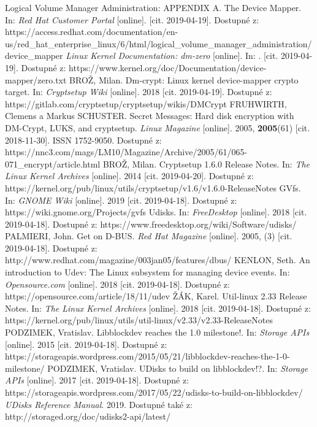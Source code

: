 \documentclass[a4paper,12pt]{article}
\begin{document}
{
Logical Volume Manager Administration: APPENDIX A. The Device Mapper. In: \textit{Red Hat Customer Portal} [online]. [cit. 2019-04-19]. Dostupné z: https://access.redhat.com/documentation/en-us/red\_hat\_enterprise\_linux/6/html/logical\_volume\_manager\_administration/\\device\_mapper
\textit{Linux Kernel Documentation: dm-zero} [online]. In: . [cit. 2019-04-19]. Dostupné z: https://www.kernel.org/doc/Documentation/device-mapper/zero.txt
BROŽ, Milan. Dm-crypt: Linux kernel device-mapper crypto target. In: \textit{Cryptsetup Wiki} [online]. 2018 [cit. 2019-04-19]. Dostupné z: https://gitlab.com/cryptsetup/cryptsetup/wikis/DMCrypt
FRUHWIRTH, Clemens a Markus SCHUSTER. Secret Messages: Hard disk encryption with DM-Crypt, LUKS, and cryptsetup. \textit{Linux Magazine} [online]. 2005, \textbf{2005}(61) [cit. 2018-11-30]. ISSN 1752-9050. Dostupné z: https://nnc3.com/mags/LM10/Magazine/Archive/2005/61/065-071\_encrypt/article.html
BROŽ, Milan. Cryptsetup 1.6.0 Release Notes. In: \textit{The Linux Kernel Archives} [online]. 2014 [cit. 2019-04-20]. Dostupné z: https://kernel.org/pub/linux/utils/cryptsetup/v1.6/v1.6.0-ReleaseNotes
GVfs. In: \textit{GNOME Wiki} [online]. 2019 [cit. 2019-04-18]. Dostupné z: https://wiki.gnome.org/Projects/gvfs
Udisks. In: \textit{FreeDesktop} [online]. 2018 [cit. 2019-04-18]. Dostupné z: https://www.freedesktop.org/wiki/Software/udisks/
PALMIERI, John. Get on D-BUS. \textit{Red Hat Magazine} [online]. 2005, (3) [cit. 2019-04-18]. Dostupné z: http://www.redhat.com/magazine/003jan05/features/dbus/
KENLON, Seth. An introduction to Udev: The Linux subsystem for managing device events. In: \textit{Opensource.com} [online]. 2018 [cit. 2019-04-18]. Dostupné z: https://opensource.com/article/18/11/udev
ŽÁK, Karel. Util-linux 2.33 Release Notes. In: \textit{The Linux Kernel Archives} [online]. 2018 [cit. 2019-04-18]. Dostupné z: https://kernel.org/pub/linux/utils/util-linux/v2.33/v2.33-ReleaseNotes
PODZIMEK, Vratislav. Libblockdev reaches the 1.0 milestone!. In: \textit{Storage APIs} [online]. 2015 [cit. 2019-04-18]. Dostupné z: https://storageapis.wordpress.com/2015/05/21/libblockdev-reaches-the-1-0-milestone/
PODZIMEK, Vratislav. UDisks to build on libblockdev!?. In: \textit{Storage APIs} [online]. 2017 [cit. 2019-04-18]. Dostupné z: https://storageapis.wordpress.com/2017/05/22/udisks-to-build-on-libblockdev/
\textit{UDisks Reference Manual}. 2019. Dostupné také z: http://storaged.org/doc/udisks2-api/latest/
}
\end{document}
